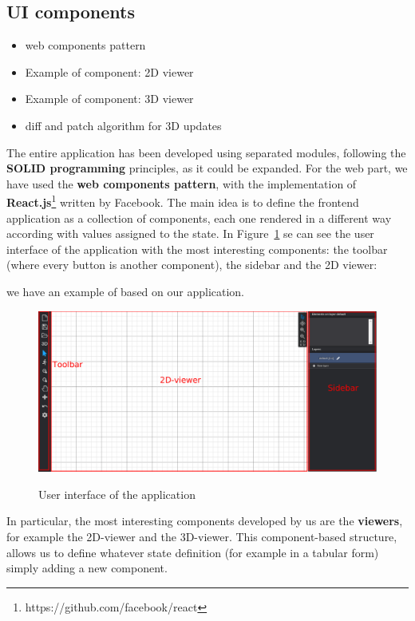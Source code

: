 \subsection{UI components}\label{sec:ui_components}

\begin{itemize}
 \item web components pattern
 \item Example of component: 2D viewer
 \item Example of component: 3D viewer
 \item diff and patch algorithm for 3D updates
\end{itemize}


The entire application has been developed using separated modules, following the \textbf{SOLID programming} principles, as it could be expanded. For the web part, we have used the \textbf{web components pattern}, with the implementation of \textbf{React.js}\footnote{https://github.com/facebook/react} written by Facebook. The main idea is to define the frontend application as a collection of components, each one rendered in a different way according with values assigned to the state. In Figure~\ref{fig_ui} se can see the user interface of the application with the most interesting components: the toolbar (where every button is another component), the sidebar and the 2D viewer:

we have an example of based on our application.\\

\begin{figure}[h]
\centering
\includegraphics[width=\linewidth]{contents/images/ui}\\
\caption{User interface of the application}
\label{fig_ui}
\end{figure}

In particular, the most interesting components developed by us are the \textbf{viewers}, for example the 2D-viewer and the 3D-viewer. This component-based structure, allows us to define whatever state definition (for example in a tabular form) simply adding a new component.\\

